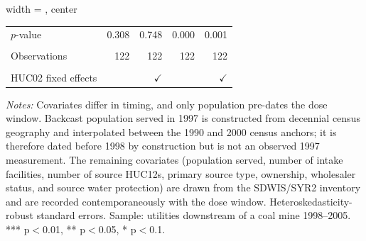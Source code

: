\begin{table}[htbp]
\begin{adjustbox}{width = \textwidth, center}
\begin{tabular}{lrrrr}
         \hspace{1em} $p$-value          & 0.308                    & 0.748                    & 0.000                    & 0.001\\  
         
          \\
         
         Observations                    & 122                      & 122                      & 122                      & 122\\  
         
          \\
         
         HUC02 fixed effects             &                          & $\checkmark$             &                          & $\checkmark$\\   
         
         \bottomrule
         
      \end{tabular}
      
      
      
   \end{adjustbox}
      {\tiny\linespread{1}\selectfont \par \raggedright 
   \textit{Notes:} Covariates differ in timing, and only population pre-dates the dose window. Backcast population served in 1997 is constructed from decennial census geography and interpolated between the 1990 and 2000 census anchors; it is therefore dated before 1998 by construction but is not an observed 1997 measurement. The remaining covariates (population served, number of intake facilities, number of source HUC12s, primary source type, ownership, wholesaler status, and source water protection) are drawn from the SDWIS/SYR2 inventory and are recorded contemporaneously with the dose window. Heteroskedasticity-robust standard errors. Sample: utilities downstream of a coal mine 1998--2005. *** p$<$0.01, ** p$<$0.05, * p$<$0.1.}
   
\end{table}


